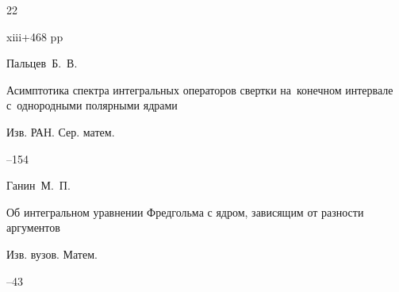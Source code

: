 \begin{thebibliography}{22}

xiii+468 pp







\by Пальцев~Б.~В.

\paper Асимптотика спектра интегральных операторов свертки на~конечном интервале с~однородными полярными ядрами

\jour Изв. РАН. Сер. матем.




--154





















\by Ганин~М.~П.

\paper Об интегральном уравнении Фредгольма с ядром, зависящим от разности аргументов

\jour Изв. вузов. Матем.



--43




\end{thebibliography}
